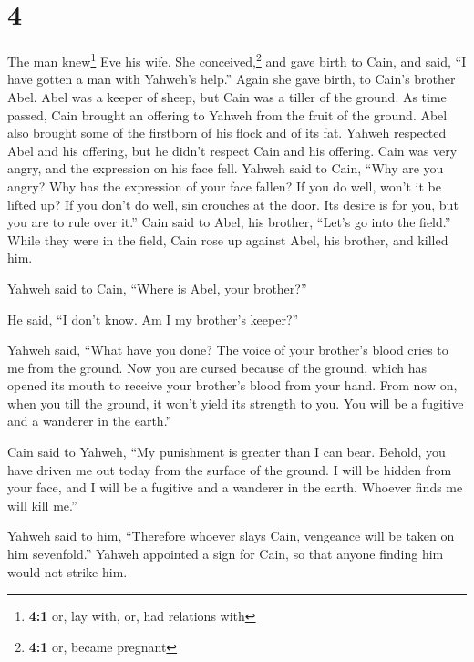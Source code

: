 \hypertarget{section-3}{%
\section{4}\label{section-3}}

 The man knew\footnote{\textbf{4:1} or, lay with, or, had
  relations with} Eve his wife. She conceived,\footnote{\textbf{4:1} or,
  became pregnant} and gave birth to Cain, and said, ``I have gotten a
man with Yahweh's help.''  Again she gave birth, to Cain's
brother Abel. Abel was a keeper of sheep, but Cain was a tiller of the
ground.  As time passed, Cain brought an offering to
Yahweh from the fruit of the ground.  Abel also brought
some of the firstborn of his flock and of its fat. Yahweh respected Abel
and his offering,  but he didn't respect Cain and his
offering. Cain was very angry, and the expression on his face fell.
 Yahweh said to Cain, ``Why are you angry? Why has the
expression of your face fallen?  If you do well, won't it
be lifted up? If you don't do well, sin crouches at the door. Its desire
is for you, but you are to rule over it.''  Cain said to
Abel, his brother, ``Let's go into the field.'' While they were in the
field, Cain rose up against Abel, his brother, and killed him.

 Yahweh said to Cain, ``Where is Abel, your brother?''

He said, ``I don't know. Am I my brother's keeper?''

 Yahweh said, ``What have you done? The voice of your
brother's blood cries to me from the ground.  Now you are
cursed because of the ground, which has opened its mouth to receive your
brother's blood from your hand.  From now on, when you
till the ground, it won't yield its strength to you. You will be a
fugitive and a wanderer in the earth.''

 Cain said to Yahweh, ``My punishment is greater than I
can bear.  Behold, you have driven me out today from the
surface of the ground. I will be hidden from your face, and I will be a
fugitive and a wanderer in the earth. Whoever finds me will kill me.''

 Yahweh said to him, ``Therefore whoever slays Cain,
vengeance will be taken on him sevenfold.'' Yahweh appointed a sign for
Cain, so that anyone finding him would not strike him.

